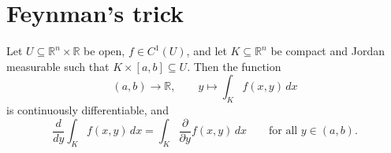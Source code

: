 
\section{Feynman's trick}
\label{sec:feynmans_trick}

\begin{theorem}
\label{thm:feynmans_trick}
Let $U \subseteq \mathbb{R}^n\times\mathbb{R}$ be open, $f \in C^1(U)$, and let
$K \subseteq \mathbb{R}^n$ be compact and Jordan measurable such that
$K\times[a,b] \subseteq U$. Then the function
\[(a,b) \to \mathbb{R}, \qquad y \mapsto \int_K f(x,y)\,dx\]
is continuously differentiable, and
\[\frac{d}{dy}\int_K f(x,y)\,dx = \int_K \frac{\partial}{\partial y}f(x,y)\,dx
\qquad \text{for all } y \in (a,b).\]
\end{theorem}

